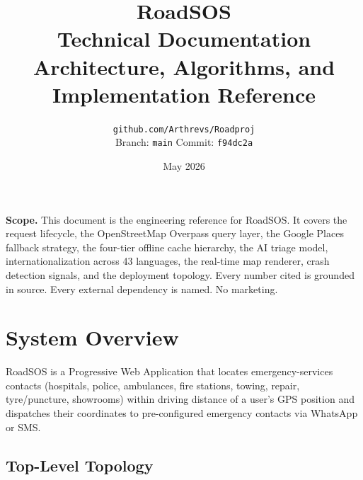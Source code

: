 \documentclass[11pt, a4paper]{article}
\title{
  \vspace{-1.5cm}
  \Huge\bfseries\color{rsnavy} RoadSOS \\
  \large\normalfont\color{rsgrey} Technical Documentation \\[0.4em]
  \normalsize\color{rsgrey} Architecture, Algorithms, and Implementation Reference
}
\author{
  \small\color{rsgrey} \texttt{github.com/Arthrevs/Roadproj} \\
  \small\color{rsgrey} Branch: \texttt{main} \quad Commit: \texttt{f94dc2a}
}
\date{\small\color{rsgrey} May 2026}
\begin{document}
\maketitle
\thispagestyle{empty}
\vspace{0.5cm}

\begin{center}
\colorbox{rscode}{\parbox{0.85\textwidth}{\centering\small
\textbf{Scope.} This document is the engineering reference for RoadSOS. It covers the request lifecycle, the OpenStreetMap Overpass query layer, the Google Places fallback strategy, the four-tier offline cache hierarchy, the AI triage model, internationalization across 43 languages, the real-time map renderer, crash detection signals, and the deployment topology. Every number cited is grounded in source. Every external dependency is named. No marketing.
}}
\end{center}

\vspace{0.4cm}
{\small\tableofcontents}
\newpage

\section{System Overview}

RoadSOS is a Progressive Web Application that locates emergency-services contacts (hospitals, police, ambulances, fire stations, towing, repair, tyre/puncture, showrooms) within driving distance of a user's GPS position and dispatches their coordinates to pre-configured emergency contacts via WhatsApp or SMS.

\subsection{Top-Level Topology}
\end{document}
